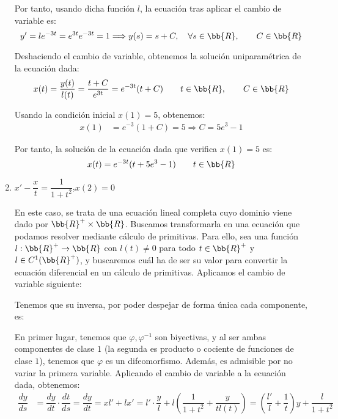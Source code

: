 \begin{ejercicio}
\begin{enumerate}
        Por tanto, usando dicha función $l$, la ecuación tras aplicar el cambio de variable es:
        \begin{equation*}
            y' = le^{-3t} = e^{3t}e^{-3t} = 1 \Longrightarrow y(s) = s + C,\quad \forall s\in \bb{R}, \qquad C\in \bb{R}
        \end{equation*}

        Deshaciendo el cambio de variable, obtenemos la solución uniparamétrica de la ecuación dada:
        \begin{equation*}
            x(t) = \dfrac{y(t)}{l(t)} = \dfrac{t+C}{e^{3t}} = e^{-3t}(t+C) \qquad t\in \bb{R}, \qquad C\in \bb{R}
        \end{equation*}

        Usando la condición inicial $x(1)=5$, obtenemos:
        \begin{align*}
            x(1) &= e^{-3}(1+C) = 5 \Longrightarrow C=5e^3-1
        \end{align*}

        Por tanto, la solución de la ecuación dada que verifica $x(1)=5$ es:
        \begin{equation*}
            x(t) = e^{-3t}(t+5e^3-1) \qquad t\in \bb{R}
        \end{equation*}

        \item $x' - \dfrac{x}{t} = \dfrac{1}{1+t^2}$,\qquad $x(2) = 0$
        
        En este caso, se trata de una ecuación lineal completa cuyo dominio viene dado por $\bb{R}^+\times \bb{R}$.
        Buscamos transformarla en una ecuación que podamos resolver mediante cálculo de primitivas.
        Para ello, sea una función $l:\bb{R}^+\to \bb{R}$ con $l(t)\neq 0$ para todo $t\in \bb{R}^+$ y $l\in C^1(\bb{R}^+)$, y buscaremos cuál ha de ser su valor para convertir la ecuación diferencial en un cálculo de primitivas.
        Aplicamos el cambio de variable siguiente:

        Tenemos que su inversa, por poder despejar de forma única cada componente, es:

        En primer lugar, tenemos que $\varphi,\varphi^{-1}$ son biyectivas, y al ser ambas componentes de clase $1$ (la segunda es producto o cociente de funciones de clase $1$), tenemos que $\varphi$ es un difeomorfismo. Además, es admisible por no variar la primera variable.
        Aplicando el cambio de variable a la ecuación dada, obtenemos:
        \begin{align*}
            \dfrac{dy}{ds} &= \dfrac{dy}{dt}\cdot \dfrac{dt}{ds} = \dfrac{dy}{dt} = xl' + lx' = l'\cdot \dfrac{y}{l} + l\left(\dfrac{1}{1+t^2} +\dfrac{y}{tl(t)}\right)
            = \left(\dfrac{l'}{l} +\dfrac{1}{t}\right)y + \dfrac{l}{1+t^2}
        \end{align*}


\end{enumerate}
\end{ejercicio}
